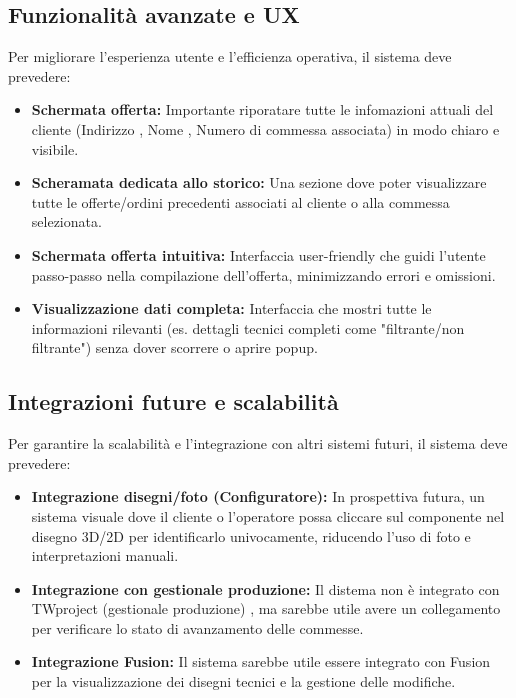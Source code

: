 \documentclass[12pt, a4paper]{article} %
\begin{document}
\subsection{Funzionalità avanzate e UX}
Per migliorare l'esperienza utente e l'efficienza operativa, il sistema deve prevedere:
\begin{itemize}
      \item \textbf{Schermata offerta:} Importante riporatare tutte le infomazioni attuali del cliente (Indirizzo , Nome , Numero di commessa associata) in modo chiaro e visibile.
      \item \textbf{Scheramata dedicata allo storico:} Una sezione dove poter visualizzare tutte le offerte/ordini precedenti associati al cliente o alla commessa selezionata.
      \item \textbf{Schermata offerta intuitiva:} Interfaccia user-friendly che guidi l'utente passo-passo nella compilazione dell'offerta, minimizzando errori e omissioni.
      \item \textbf{Visualizzazione dati completa:} Interfaccia che mostri tutte le informazioni rilevanti (es. dettagli tecnici completi come "filtrante/non filtrante") senza dover scorrere o aprire popup.
\end{itemize}

\subsection{Integrazioni future e scalabilità}
Per garantire la scalabilità e l'integrazione con altri sistemi futuri, il sistema deve prevedere:
\begin{itemize}
      \item \textbf{Integrazione disegni/foto (Configuratore):} In prospettiva futura, un sistema visuale dove il cliente o l'operatore possa cliccare sul componente nel disegno 3D/2D per identificarlo univocamente,
            riducendo l'uso di foto e interpretazioni manuali.
      \item \textbf{Integrazione con gestionale produzione:} Il distema non è integrato con TWproject (gestionale produzione) ,
            ma sarebbe utile avere un collegamento per verificare lo stato di avanzamento delle commesse.
      \item \textbf{Integrazione Fusion:} Il sistema sarebbe utile essere integrato con Fusion per la visualizzazione dei disegni tecnici e la gestione delle modifiche.
\end{itemize}
\end{document}
